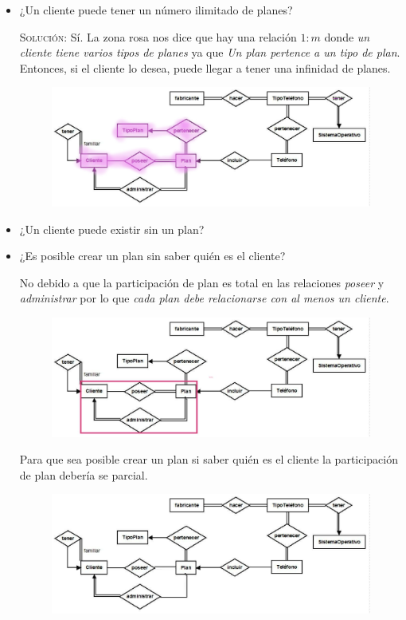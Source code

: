\documentclass[letterpaper,11pt]{article}
\begin{document}
\begin{itemize}
    \item ¿Un cliente puede tener un número ilimitado de planes?

    \textsc{Solución:} Sí. La zona rosa nos dice que hay una relación $1:m$ 
    donde \textit{un cliente tiene varios tipos de planes} ya que 
    \textit{Un plan pertence a un tipo de plan}. Entonces, si el 
    cliente lo desea, puede llegar a tener una infinidad de planes.

    \begin{figure}[h]
        \centering
        \includegraphics[scale=0.4]{./imagenes/modelo1.jpg}
    \end{figure}
    
    \item ¿Un cliente puede existir sin un plan?
    
    \item ¿Es posible crear un plan sin saber quién es el cliente?
    
    No debido a que la participación de plan es total en las relaciones \textit{poseer} 
    y \textit{administrar} por lo que \textit{cada plan debe relacionarse con al menos 
    un cliente}. 
    \begin{figure}[H]
        \centering
        \includegraphics[scale=0.4]{./imagenes/modelo3a.jpg}
    \end{figure}
    Para que sea posible crear un plan si saber quién es el cliente la participación
    de plan debería se parcial.
    \begin{figure}[H]
        \centering
        \includegraphics[scale=0.4]{./imagenes/modelo3b.jpg}
    \end{figure}


\end{itemize}
\end{document}
